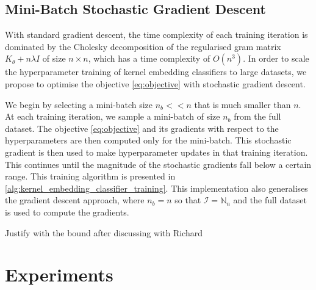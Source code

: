 \documentclass{article}
\newcommand{\note}[1]{{\color{orange} #1}}
\begin{document}
	\subsection{Mini-Batch Stochastic Gradient Descent}
	\label{sec:stochastic_gradient_descent}

		With standard gradient descent, the time complexity of each training iteration is dominated by the Cholesky decomposition of the regularised gram matrix $K_{\theta} + n \lambda I$ of size $n \times n$, which has a time complexity of $O(n^{3})$. In order to scale the hyperparameter training of kernel embedding classifiers to large datasets, we propose to optimise the objective \eqref{eq:objective} with stochastic gradient descent.
				
		We begin by selecting a mini-batch size $n_{b} << n$ that is much smaller than $n$. At each training iteration, we sample a mini-batch of size $n_{b}$ from the full dataset. The objective \eqref{eq:objective} and its gradients with respect to the hyperparameters are then computed only for the mini-batch. This stochastic gradient is then used to make hyperparameter updates in that training iteration. This continues until the magnitude of the stochastic gradients fall below a certain range. This training algorithm is presented in \cref{alg:kernel_embedding_classifier_training}. This implementation also generalises the gradient descent approach, where $n_{b} = n$ so that $\mathcal{I} = \mathbb{N}_{n}$ and the full dataset is used to compute the gradients.
		
		\note{Justify with the bound after discussing with Richard}

\section{Experiments}
\end{document}
